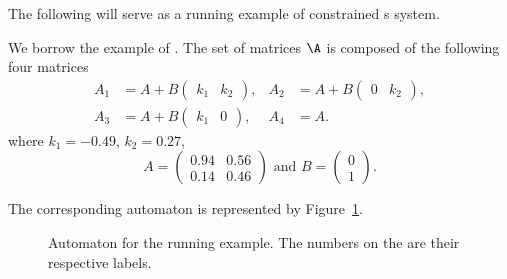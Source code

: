 \documentclass[11pt,twoside,a4paper,openright]{uclouvain-thesis}
\begin{document}
The following will serve as a running example of constrained s\witch{} system.

\begin{myexem}%
  \label{exem:run1}
  We borrow the example of \cite[]{philippe2016stability}.
  The set of matrices $\A$ is composed of the following four matrices
  \begin{align*}
    A_1 & = A+B
    \begin{pmatrix}
      k_1 & k_2
    \end{pmatrix},&
    A_2 & = A+B
    \begin{pmatrix}
      0 & k_2
    \end{pmatrix},\\
    A_3 & = A+B
    \begin{pmatrix}
      k_1 & 0
    \end{pmatrix},&
    A_4 & = A.
  \end{align*}
  where $k_1 = -0.49$, $k_2 = 0.27$,
  \[
    A =
    \begin{pmatrix}
      0.94 & 0.56\\
      0.14 & 0.46
    \end{pmatrix} \text{ and }
    B =
    \begin{pmatrix}
      0\\
      1
    \end{pmatrix}.
  \]

  The corresponding automaton is represented by Figure~\ref{fig:run}.

  \begin{figure}[!ht]
    \centering
     \caption{Automaton for the running example.
     The numbers on the \arcs{} are their respective labels.
     }
     \label{fig:run}
  \end{figure}
\end{myexem}
\end{document}
